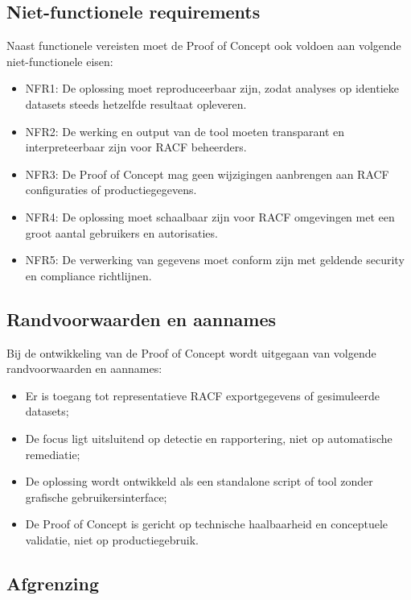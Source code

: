 \subsection{Niet-functionele requirements}

Naast functionele vereisten moet de Proof of Concept ook voldoen aan volgende niet-functionele eisen:

\begin{itemize}
	\item NFR1: De oplossing moet reproduceerbaar zijn, zodat analyses op identieke datasets steeds hetzelfde resultaat opleveren.
	\item NFR2: De werking en output van de tool moeten transparant en interpreteerbaar zijn voor RACF beheerders.
	\item NFR3: De Proof of Concept mag geen wijzigingen aanbrengen aan RACF configuraties of productiegegevens.
	\item NFR4: De oplossing moet schaalbaar zijn voor RACF omgevingen met een groot aantal gebruikers en autorisaties.
	\item NFR5: De verwerking van gegevens moet conform zijn met geldende security en compliance richtlijnen.
\end{itemize}

\subsection{Randvoorwaarden en aannames}

Bij de ontwikkeling van de Proof of Concept wordt uitgegaan van volgende randvoorwaarden en aannames:
\begin{itemize}
	\item Er is toegang tot representatieve RACF exportgegevens of gesimuleerde datasets;
	\item De focus ligt uitsluitend op detectie en rapportering, niet op automatische remediatie;
	\item De oplossing wordt ontwikkeld als een standalone script of tool zonder grafische gebruikersinterface;
	\item De Proof of Concept is gericht op technische haalbaarheid en conceptuele validatie, niet op productiegebruik.
\end{itemize}

\subsection{Afgrenzing}

